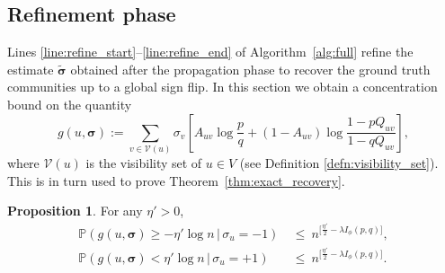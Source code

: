 \documentclass[letterpaper,11pt]{article}
\newtheorem{prop}[thm]{Proposition}
\theoremstyle{definition}
\def\P{\mathbb{P}}
\newcommand{\bsigma}{\bm{\sigma}}
\def\cV{\mathcal{V}}
\def\wle{ \ \le \ }
\numberwithin{equation}{section}
\newcommand{\la}{\lambda}
\newtheorem{prop}[thm]{Proposition}
\theoremstyle{definition}
\def\P{\mathbb{P}}
\newcommand{\bsigma}{\bm{\sigma}}
\def\cV{\mathcal{V}}
\def\wle{ \ \le \ }
\numberwithin{equation}{section}
\newcommand{\la}{\lambda}
\theoremstyle{thmstyletwo}%
\begin{document}
\subsection{Refinement phase}
Lines \ref{line:refine_start}--\ref{line:refine_end} of Algorithm~\ref{alg:full} refine the estimate $\tilde{\bsigma}$ obtained after the propagation phase to recover the ground truth communities up to a global sign flip. In this section we obtain a concentration bound on the quantity 
\[
g(u,\bsigma)
:= \sum_{v\in \cV(u)} \sigma_v \left[
A_{uv} \log \frac{p}{q} + (1-A_{uv})
\log \frac{1-p Q_{uv}}{1-q Q_{uv}} \right],
\]
where $\cV(u)$ is the visibility set of $u\in V$ (see Definition \ref{defn:visibility_set}). This is in turn used to prove Theorem~\ref{thm:exact_recovery}.

\begin{prop}
\label{prop:refinement_conc_bound}
For any $\eta'>0$,
\begin{align*}
\P(g(u,\bsigma) \ge - \eta' \log n \,|\,\sigma_u=-1) 
&\wle n^{\big[\frac{\eta'}{2} - \la I_{\phi}(p,q)\big]},\\
\P(g(u,\bsigma) <\eta' \log n \,|\,\sigma_u=+1) 
&\wle n^{\big[\frac{\eta'}{2} - \la I_{\phi}(p,q)\big]}.
\end{align*}
\end{prop}
\end{document}
